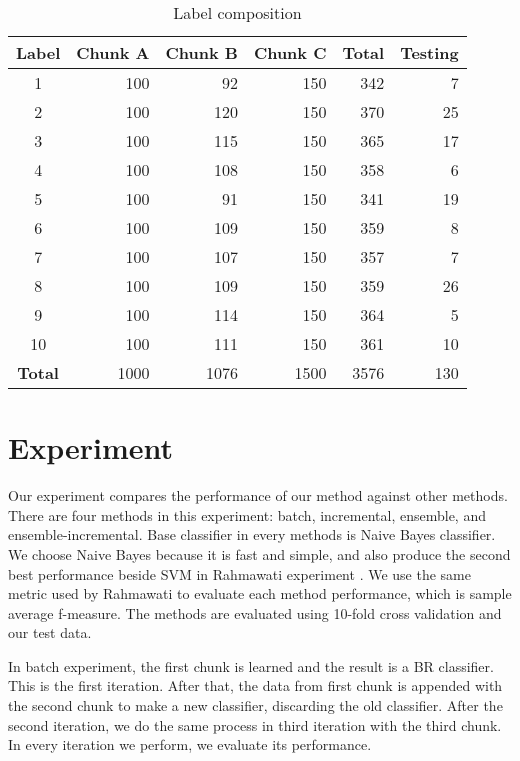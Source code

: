 \documentclass[conference]{IEEEtran}
\begin{document}
\begin{table}[!htb]
\renewcommand{\arraystretch}{1.3}
\caption{Label composition}
\label{label_compos}
\centering
\begin{tabular}{|c|r|r|r|r|r|}
    \hline
    Label & Chunk A & Chunk B & Chunk C & \textbf{Total} & Testing\\
    \hline
    1 & 100 & 92 & 150 & 342 & 7\\
    \hline
    2 & 100 & 120 & 150 & 370 & 25\\
    \hline
    3 & 100 & 115 & 150 & 365 & 17\\
    \hline
    4 & 100 & 108 & 150 & 358 & 6\\
    \hline
    5 & 100 & 91 & 150 & 341 & 19\\
    \hline
    6 & 100 & 109 & 150 & 359 & 8\\
    \hline
    7 & 100 & 107 & 150 & 357 & 7\\
    \hline
    8 & 100 & 109 & 150 & 359 & 26\\
    \hline
    9 & 100 & 114 & 150 & 364 & 5\\
    \hline
    10 & 100 & 111 & 150 & 361 & 10\\
    \hline
    \textbf{Total} & 1000 & 1076 & 1500 & 3576 & 130\\
    \hline
\end{tabular}
\end{table}

\section{Experiment}

Our experiment compares the performance of our method against other methods.
There are four methods in this experiment: batch, incremental, ensemble, and ensemble-incremental.
Base classifier in every methods is Naive Bayes classifier.
We choose Naive Bayes because it is fast and simple, and also produce the second best performance beside SVM in Rahmawati experiment \cite{rahma}.
We use the same metric used by Rahmawati to evaluate each method performance, which is sample average f-measure.
The methods are evaluated using 10-fold cross validation and our test data.

In batch experiment, the first chunk is learned and the result is a BR classifier.
This is the first iteration.
After that, the data from first chunk is appended with the second chunk to make a new classifier, discarding the old classifier.
After the second iteration, we do the same process in third iteration with the third chunk.
In every iteration we perform, we evaluate its performance.
\end{document}
